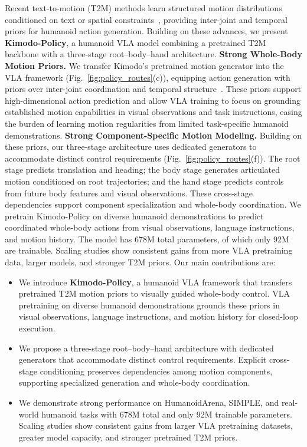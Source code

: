 
Recent text-to-motion (T2M) methods learn structured motion distributions conditioned on text or spatial constraints~\cite{temos,mdm,mld,t2mgpt,momask,omnicontrol}, providing inter-joint and temporal priors for humanoid action generation. 
Building on these advances, we present \textbf{Kimodo-Policy}, a humanoid VLA model combining a pretrained T2M backbone with a three-stage root--body--hand architecture.
\textbf{ Strong Whole-Body Motion Priors.}
We transfer Kimodo's pretrained motion generator into the VLA framework (Fig.~\ref{fig:policy_routes}(c)), equipping action generation with priors over inter-joint coordination and temporal structure~\cite{kimodo}.
These priors support high-dimensional action prediction and allow VLA training to focus on grounding established motion capabilities in visual observations and task instructions, easing the burden of learning motion regularities from limited task-specific humanoid demonstrations.
\textbf{ Strong Component-Specific Motion Modeling.}
Building on these priors, our three-stage architecture uses dedicated generators to accommodate distinct control requirements (Fig.~\ref{fig:policy_routes}(f)). The root stage predicts translation and heading; the body stage generates articulated motion conditioned on root trajectories; and the hand stage predicts controls from future body features and visual observations. These cross-stage dependencies support component specialization and whole-body coordination.
We pretrain Kimodo-Policy on diverse humanoid demonstrations to predict coordinated whole-body actions from visual observations, language instructions, and motion history. The model has 678M total parameters, of which only 92M are trainable. Scaling studies show consistent gains from more VLA pretraining data, larger models, and stronger T2M priors. Our main contributions are:
\begin{itemize}
  \item We introduce \textbf{Kimodo-Policy}, a humanoid VLA framework that transfers pretrained T2M motion priors to visually guided whole-body control. VLA pretraining on diverse humanoid demonstrations grounds these priors in visual observations, language instructions, and motion history for closed-loop execution.

  \item We propose a three-stage root--body--hand architecture with dedicated generators that accommodate distinct control requirements. Explicit cross-stage conditioning preserves dependencies among motion components, supporting specialized generation and whole-body coordination.
  
  \item We demonstrate strong performance on HumanoidArena, SIMPLE, and real-world humanoid tasks with 678M total and only 92M trainable parameters. Scaling studies show consistent gains from larger VLA pretraining datasets, greater model capacity, and stronger pretrained T2M priors.
\end{itemize}

